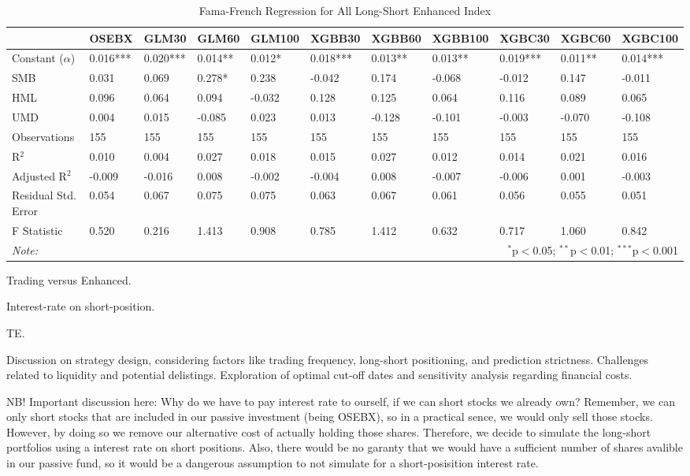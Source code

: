 \begin{table}
\centering 
\caption{Fama-French Regression for All Long-Short Enhanced Index}
\vspace{1em}
\label{table:enhanced-models_without_L-all}
\begin{tabularx}{\textwidth}{lXXXXXXXXXX} 
\toprule
 & OSEBX & GLM30 & GLM60 & GLM100 & XGBB30 & XGBB60 & XGBB100 & XGBC30 & XGBC60 & XGBC100 \\ 
\midrule
 Constant ($\alpha$) & 0.016*** & 0.020*** & 0.014** & 0.012* & 0.018*** & 0.013** & 0.013** & 0.019*** & 0.011** & 0.014*** \\ 
 SMB & 0.031 & 0.069 & 0.278* & 0.238 & -0.042 & 0.174 & -0.068 & -0.012 & 0.147 & -0.011 \\ 
 HML & 0.096 & 0.064 & 0.094 & -0.032 & 0.128 & 0.125 & 0.064 & 0.116 & 0.089 & 0.065 \\ 
 UMD & 0.004 & 0.015 & -0.085 & 0.023 & 0.013 & -0.128 & -0.101 & -0.003 & -0.070 & -0.108 \\ 
\midrule
 Observations & 155 & 155 & 155 & 155 & 155 & 155 & 155 & 155 & 155 & 155 \\ 
 R$^{2}$ & 0.010 & 0.004 & 0.027 & 0.018 & 0.015 & 0.027 & 0.012 & 0.014 & 0.021 & 0.016 \\ 
 Adjusted R$^{2}$ & -0.009 & -0.016 & 0.008 & -0.002 & -0.004 & 0.008 & -0.007 & -0.006 & 0.001 & -0.003 \\ 
 Residual Std. Error & 0.054 & 0.067 & 0.075 & 0.075 & 0.063 & 0.067 & 0.061 & 0.056 & 0.055 & 0.051 \\ 
 F Statistic & 0.520 & 0.216 & 1.413 & 0.908 & 0.785 & 1.412 & 0.632 & 0.717 & 1.060 & 0.842 \\ 
\bottomrule
\textit{Note:} & \multicolumn{10}{r}{$^{*}$p$<$0.05; $^{**}$p$<$0.01; $^{***}$p$<$0.001} \\ 
\end{tabularx} 
\end{table}


Trading versus Enhanced. 

Interest-rate on short-position. 

TE. 

Discussion on strategy design, considering factors like trading frequency, long-short positioning, and prediction strictness. Challenges related to liquidity and potential delistings. Exploration of optimal cut-off dates and sensitivity analysis regarding financial costs.


NB! Important discussion here: Why do we have to pay interest rate to ourself, if we can short stocks we already own? Remember, we can only short stocks that are included in our passive investment (being OSEBX), so in a practical sence, we would only sell those stocks. However, by doing so we remove our alternative cost of actually holding those shares. Therefore, we decide to simulate the long-short portfolios using a interest rate on short positions. Also, there would be no garanty that we would have a sufficient number of shares avalible in our passive fund, so it would be a dangerous assumption to not simulate for a short-posisition interest rate.




